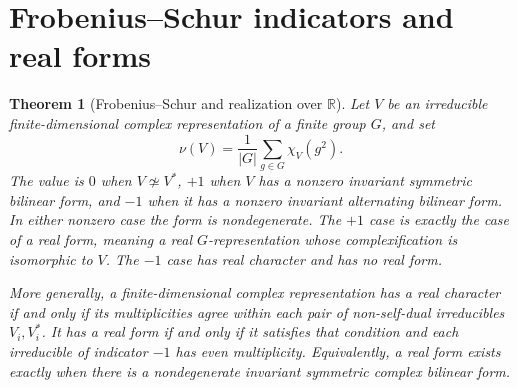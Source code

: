 \documentclass[11pt,oneside,openany]{book}
\newtheorem{theorem}{Theorem}[chapter]
\theoremstyle{definition}
\theoremstyle{remark}
\begin{document}
\section{Frobenius--Schur indicators and real forms}

\begin{theorem}[Frobenius--Schur and realization over \(\mathbb R\)]
\label{p103:ALG-07-C02-S04}
Let \(V\) be an irreducible finite-dimensional complex representation
of a finite group \(G\), and set
\[
 \nu(V)=\frac{1}{|G|}\sum_{g\in G}\chi_V(g^2).
\]
The value is \(0\) when \(V\not\simeq V^*\), \(+1\) when \(V\) has a
nonzero invariant symmetric bilinear form, and \(-1\) when it has a
nonzero invariant alternating bilinear form. In either nonzero case
the form is nondegenerate. The \(+1\) case is exactly the case of a
real form, meaning a real \(G\)-representation whose complexification
is isomorphic to \(V\). The \(-1\) case has real character and has no
real form.

More generally, a finite-dimensional complex representation has a
real character if and only if its multiplicities agree within each
pair of non-self-dual irreducibles \(V_i,V_i^*\). It has a real form
if and only if it satisfies that condition and each irreducible
of indicator \(-1\) has even multiplicity. Equivalently, a real
form exists exactly when there is a nondegenerate invariant
symmetric complex bilinear form.
\end{theorem}
\end{document}
